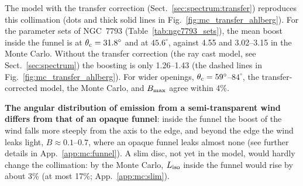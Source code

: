 The model with the transfer correction (Sect.~\ref{sec:spectrum:transfer}) reproduces this collimation (dots and thick solid lines in Fig.~\ref{fig:mc_transfer_ahlberg}).
For the parameter sets of NGC~7793 (Table~\ref{tab:ngc7793_sets}),
the mean boost inside the funnel is  at $\theta_{\rm c} = 31.8^\circ$ and  at $45.6^\circ$, against 4.55 and 3.02--3.15 in the Monte Carlo. Without the transfer correction (the ray cast model, see Sect.~\ref{sec:spectrum}) the boosting  is only 1.26--1.43 (the dashed lines in Fig.~\ref{fig:mc_transfer_ahlberg}).
For wider openings, $\theta_{\rm c} = 59^\circ$--$84^\circ$, the transfer-corrected model, the Monte Carlo, and $B_{\rm max}$ agree within 4\%.

\textbf{The angular distribution of emission from a semi-transparent wind differs from that of an opaque funnel}: inside the funnel the boost of the wind falls more steeply from the axis to the edge, and beyond the edge the wind leaks light, $B \approx 0.1$--$0.7$, where an opaque funnel leaks almost none (see further details in App.~\ref{app:mc:funnel}).
A slim disc, not yet in the model, would hardly change the collimation: by the Monte Carlo, $L_{\rm iso}$ inside the funnel would rise by about 3\% (at most 17\%; App.~\ref{app:mc:slim}).

